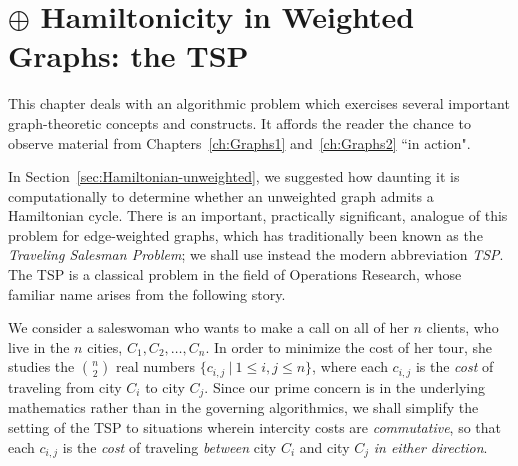 \chapter{$\oplus$ Hamiltonicity in Weighted Graphs: the TSP}
\label{sec:TSP}

This chapter deals with an algorithmic problem which exercises several important graph-theoretic concepts and constructs.  It affords the reader the chance to observe material from Chapters~\ref{ch:Graphs1} and~\ref{ch:Graphs2} ``in action".

\medskip

In Section~\ref{sec:Hamiltonian-unweighted}, we suggested how daunting it is computationally to determine whether an unweighted graph admits a Hamiltonian cycle.  There is an important, practically significant, analogue of this problem for edge-weighted graphs, which has traditionally been known as the {\it Traveling Salesman Problem}; we shall use instead the modern abbreviation {\it TSP}.  The TSP is a classical problem in the field of Operations Research, whose familiar name arises from the following story.


\smallskip

We consider a saleswoman who wants to make a call on all of her $n$ clients, who live in the $n$ cities, $C_1, C_2, \ldots, C_n$.  In order to minimize the cost of her tour, she studies the
$\displaystyle {n \choose 2}$ real numbers $\{c_{i,j} \ | \ 1 \leq i,j \leq n\}$, where each $c_{i,j}$ is the {\it cost} of traveling from city $C_i$ to city $C_j$.  Since our prime concern is in the underlying mathematics rather than in the governing algorithmics, we shall simplify the setting of the TSP to situations wherein intercity costs are {\em commutative}, so that each  $c_{i,j}$ is the {\it cost} of traveling {\em between} city $C_i$ and city $C_j$ {\em in either direction}.

\bigskip

